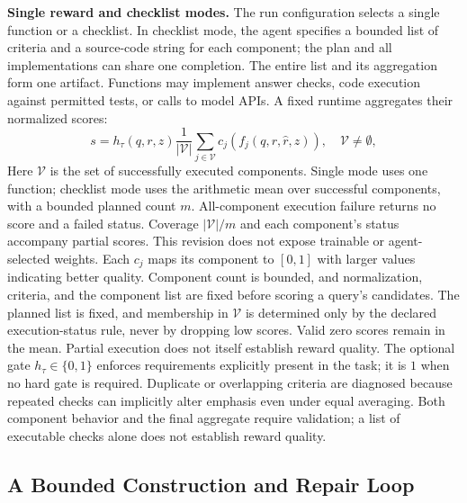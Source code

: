 \noindent\textbf{Single reward and checklist modes.} The run configuration selects a single function or a checklist. In checklist mode, the agent specifies a bounded list of criteria and a source-code string for each component; the plan and all implementations can share one completion. The entire list and its aggregation form one artifact. Functions may implement answer checks, code execution against permitted tests, or calls to model APIs. A fixed runtime aggregates their normalized scores:
\begin{equation}
    s = h_\tau(q,r,z)\frac{1}{|\mathcal V|}\sum_{j\in\mathcal V} c_j\!\left(f_j(q,r,\hat r,z)\right),
    \quad \mathcal V\neq\emptyset,
\end{equation}
Here $\mathcal V$ is the set of successfully executed components. Single mode uses one function; checklist mode uses the arithmetic mean over successful components, with a bounded planned count $m$. All-component execution failure returns no score and a failed status. Coverage $|\mathcal V|/m$ and each component's status accompany partial scores. This revision does not expose trainable or agent-selected weights. Each $c_j$ maps its component to $[0,1]$ with larger values indicating better quality. Component count is bounded, and normalization, criteria, and the component list are fixed before scoring a query's candidates. The planned list is fixed, and membership in $\mathcal V$ is determined only by the declared execution-status rule, never by dropping low scores. Valid zero scores remain in the mean. Partial execution does not itself establish reward quality. The optional gate $h_\tau\in\{0,1\}$ enforces requirements explicitly present in the task; it is $1$ when no hard gate is required. Duplicate or overlapping criteria are diagnosed because repeated checks can implicitly alter emphasis even under equal averaging. Both component behavior and the final aggregate require validation; a list of executable checks alone does not establish reward quality.

\subsection{A Bounded Construction and Repair Loop}
\label{sec:routing}


